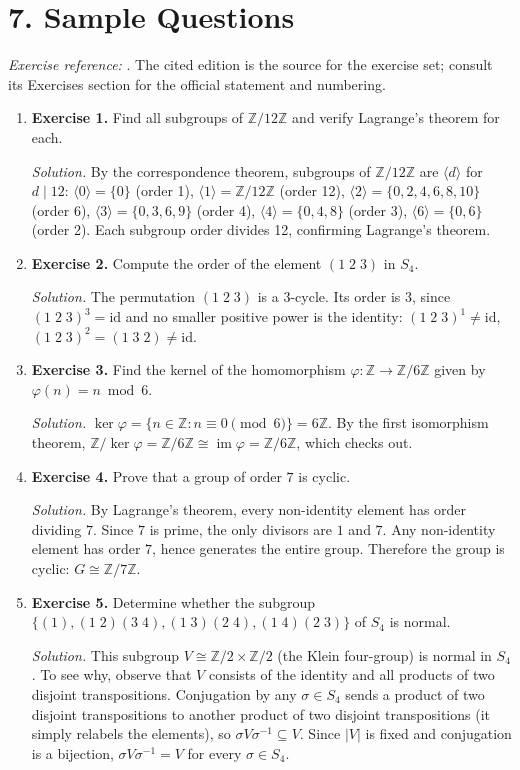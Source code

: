 \section*{7. Sample Questions}
\emph{Exercise reference:} \cite{group_theory_ref1}. The cited edition is the source for the exercise set; consult its Exercises section for the official statement and numbering.
\begin{enumerate}[leftmargin=*,itemsep=0.9em]
\item \textbf{Exercise 1.} Find all subgroups of $\mathbb{Z}/12\mathbb{Z}$ and verify Lagrange's theorem for each.

\emph{Solution.} By the correspondence theorem, subgroups of $\mathbb{Z}/12\mathbb{Z}$ are $\langle d\rangle$ for $d\mid 12$: $\langle 0\rangle=\{0\}$ (order 1), $\langle 1\rangle=\mathbb{Z}/12\mathbb{Z}$ (order 12), $\langle 2\rangle=\{0,2,4,6,8,10\}$ (order 6), $\langle 3\rangle=\{0,3,6,9\}$ (order 4), $\langle 4\rangle=\{0,4,8\}$ (order 3), $\langle 6\rangle=\{0,6\}$ (order 2). Each subgroup order divides 12, confirming Lagrange's theorem.

\item \textbf{Exercise 2.} Compute the order of the element $(1\;2\;3)$ in $S_4$.

\emph{Solution.} The permutation $(1\;2\;3)$ is a 3-cycle. Its order is $3$, since $(1\;2\;3)^3=\text{id}$ and no smaller positive power is the identity: $(1\;2\;3)^1\neq\text{id}$, $(1\;2\;3)^2=(1\;3\;2)\neq\text{id}$.

\item \textbf{Exercise 3.} Find the kernel of the homomorphism $\varphi:\mathbb{Z}\to\mathbb{Z}/6\mathbb{Z}$ given by $\varphi(n)=n\bmod 6$.

\emph{Solution.} $\ker\varphi=\{n\in\mathbb{Z}:n\equiv 0\pmod{6}\}=6\mathbb{Z}$. By the first isomorphism theorem, $\mathbb{Z}/\ker\varphi=\mathbb{Z}/6\mathbb{Z}\cong\operatorname{im}\varphi=\mathbb{Z}/6\mathbb{Z}$, which checks out.

\item \textbf{Exercise 4.} Prove that a group of order $7$ is cyclic.

\emph{Solution.} By Lagrange's theorem, every non-identity element has order dividing $7$. Since $7$ is prime, the only divisors are $1$ and $7$. Any non-identity element has order $7$, hence generates the entire group. Therefore the group is cyclic: $G\cong\mathbb{Z}/7\mathbb{Z}$.

\item \textbf{Exercise 5.} Determine whether the subgroup $\{(1),(1\;2)(3\;4),(1\;3)(2\;4),(1\;4)(2\;3)\}$ of $S_4$ is normal.

\emph{Solution.} This subgroup $V\cong\mathbb{Z}/2\times\mathbb{Z}/2$ (the Klein four-group) is normal in $S_4$. To see why, observe that $V$ consists of the identity and all products of two disjoint transpositions. Conjugation by any $\sigma\in S_4$ sends a product of two disjoint transpositions to another product of two disjoint transpositions (it simply relabels the elements), so $\sigma V\sigma^{-1}\subseteq V$. Since $|V|$ is fixed and conjugation is a bijection, $\sigma V\sigma^{-1}=V$ for every $\sigma\in S_4$.

\end{enumerate}
